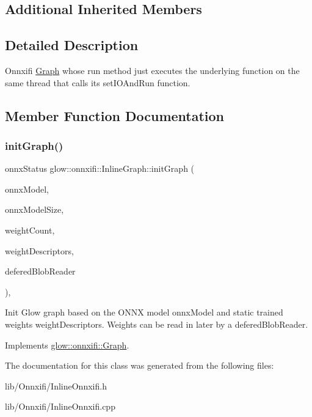 \subsection*{Additional Inherited Members}


\subsection{Detailed Description}
Onnxifi \hyperlink{classglow_1_1onnxifi_1_1_graph}{Graph} whose run method just executes the underlying function on the same thread that calls its set\+I\+O\+And\+Run function. 

\subsection{Member Function Documentation}
\mbox{\label{classglow_1_1onnxifi_1_1_inline_graph_a989222c5a599a06aef3f7fc1c394f5eb}} 
\subsubsection{\texorpdfstring{init\+Graph()}{initGraph()}}
{\footnotesize\ttfamily onnx\+Status glow\+::onnxifi\+::\+Inline\+Graph\+::init\+Graph (\begin{DoxyParamCaption}\item[{const void $\ast$}]{onnx\+Model,  }\item[{size\+\_\+t}]{onnx\+Model\+Size,  }\item[{uint32\+\_\+t}]{weight\+Count,  }\item[{const onnx\+Tensor\+Descriptor\+V1 $\ast$}]{weight\+Descriptors,  }\item[{void $\ast$}]{defered\+Blob\+Reader }\end{DoxyParamCaption})\hspace{0.3cm}{\ttfamily [override]}, {\ttfamily [virtual]}}

Init Glow graph based on the O\+N\+NX model {\ttfamily onnx\+Model} and static trained weights {\ttfamily weight\+Descriptors}. Weights can be read in later by a {\ttfamily defered\+Blob\+Reader}. 

Implements \hyperlink{classglow_1_1onnxifi_1_1_graph_a5f1ec69446852a2515d8aeec487a521a}{glow\+::onnxifi\+::\+Graph}.



The documentation for this class was generated from the following files\+:\begin{DoxyCompactItemize}
\item 
lib/\+Onnxifi/Inline\+Onnxifi.\+h\item 
lib/\+Onnxifi/Inline\+Onnxifi.\+cpp\end{DoxyCompactItemize}
